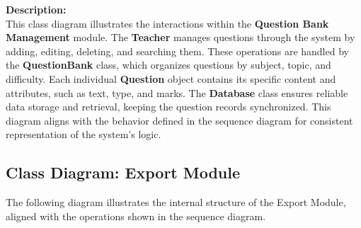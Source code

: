 \documentclass[12pt]{article}
\begin{document}
\noindent
\textbf{Description:} \\
This class diagram illustrates the interactions within the \textbf{Question Bank Management} module. The \textbf{Teacher} manages questions through the system by adding, editing, deleting, and searching them. These operations are handled by the \textbf{QuestionBank} class, which organizes questions by subject, topic, and difficulty. Each individual \textbf{Question} object contains its specific content and attributes, such as text, type, and marks. The \textbf{Database} class ensures reliable data storage and retrieval, keeping the question records synchronized. This diagram aligns with the behavior defined in the sequence diagram for consistent representation of the system’s logic.


\subsection{Class Diagram: Export Module}

The following diagram illustrates the internal structure of the Export Module, aligned with the operations shown in the sequence diagram.
\end{document}
